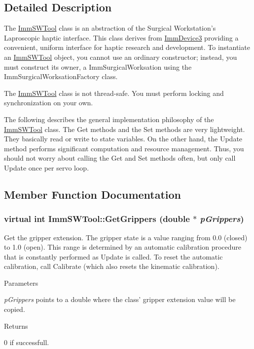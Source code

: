 \subsection{Detailed Description}
The \hyperlink{classImmSWTool}{ImmSWTool} class is an abstraction of the Surgical Workstation's Laproscopic haptic interface. This class derives from \hyperlink{classImmDevice3}{ImmDevice3} providing a convenient, uniform interface for haptic research and development. To instantiate an \hyperlink{classImmSWTool}{ImmSWTool} object, you cannot use an ordinary constructor; instead, you must construct its owner, a ImmSurgicalWorksation using the ImmSurgicalWorksationFactory class.

The \hyperlink{classImmSWTool}{ImmSWTool} class is not thread-\/safe. You must perform locking and synchronization on your own.

The following describes the general implementation philosophy of the \hyperlink{classImmSWTool}{ImmSWTool} class. The Get methods and the Set methods are very lightweight. They basically read or write to state variables. On the other hand, the Update method performs significant computation and resource management. Thus, you should not worry about calling the Get and Set methods often, but only call Update once per servo loop. 

\subsection{Member Function Documentation}
\hypertarget{classImmSWTool_ae6e63083a9e1513a7639a27d550e2cf6}{
\subsubsection[{GetGrippers}]{\setlength{\rightskip}{0pt plus 5cm}virtual int ImmSWTool::GetGrippers (double $\ast$ {\em pGrippers})}}
\label{classImmSWTool_ae6e63083a9e1513a7639a27d550e2cf6}
Get the gripper extension. The gripper state is a value ranging from 0.0 (closed) to 1.0 (open). This range is determined by an automatic calibration procedure that is constantly performed as Update is called. To reset the automatic calibration, call Calibrate (which also resets the kinematic calibration).


\begin{DoxyParams}{Parameters}
\item[{\em pGrippers}]points to a double where the class' gripper extension value will be copied.\end{DoxyParams}
\begin{DoxyReturn}{Returns}

\end{DoxyReturn}
0 if successfull.

